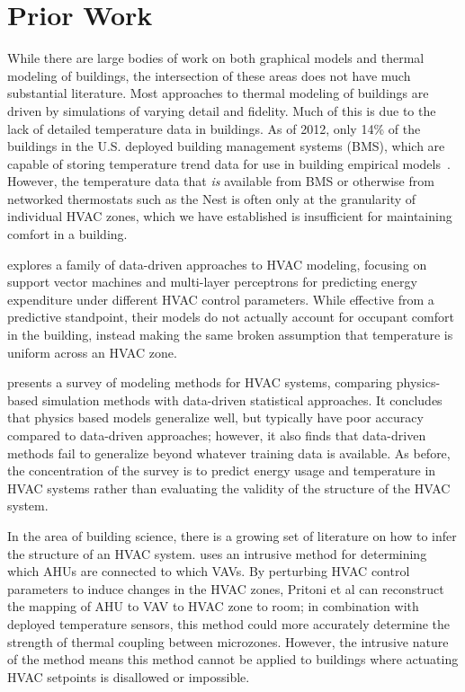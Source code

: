 \section{Prior Work}

While there are large bodies of work on both graphical models and thermal modeling of buildings, the intersection of these areas does not have much substantial literature.
Most approaches to thermal modeling of buildings are driven by simulations of varying detail and fidelity.
Much of this is due to the lack of detailed temperature data in buildings.
As of 2012, only 14\% of the buildings in the U.S. deployed building management systems (BMS), which are capable of storing temperature trend data for use in building empirical models~\cite{cbecs2012}.
However, the temperature data that \emph{is} available from BMS or otherwise from networked thermostats such as the Nest is often only at the granularity of individual HVAC zones, which we have established is insufficient for maintaining comfort in a building.

\cite{kusiak2010modeling} explores a family of data-driven approaches to HVAC modeling, focusing on support vector machines and multi-layer perceptrons for predicting energy expenditure under different HVAC control parameters.
While effective from a predictive standpoint, their models do not actually account for occupant comfort in the building, instead making the same broken assumption that temperature is uniform across an HVAC zone.

\cite{afram2014review} presents a survey of modeling methods for HVAC systems, comparing physics-based simulation methods with data-driven statistical approaches.
It concludes that physics based models generalize well, but typically have poor accuracy compared to data-driven approaches; however, it also finds that data-driven methods fail to generalize beyond whatever training data is available.
As before, the concentration of the survey is to predict energy usage and temperature in HVAC systems rather than evaluating the validity of the structure of the HVAC system.

In the area of building science, there is a growing set of literature on how to infer the structure of an HVAC system. \cite{pritoni2015short} uses an intrusive method for determining which AHUs are connected to which VAVs.
By perturbing HVAC control parameters to induce changes in the HVAC zones, Pritoni et al can reconstruct the mapping of AHU to VAV to HVAC zone to room; in combination with deployed temperature sensors, this method could more accurately determine the strength of thermal coupling between microzones.
However, the intrusive nature of the method means this method cannot be applied to buildings where actuating HVAC setpoints is disallowed or impossible.

